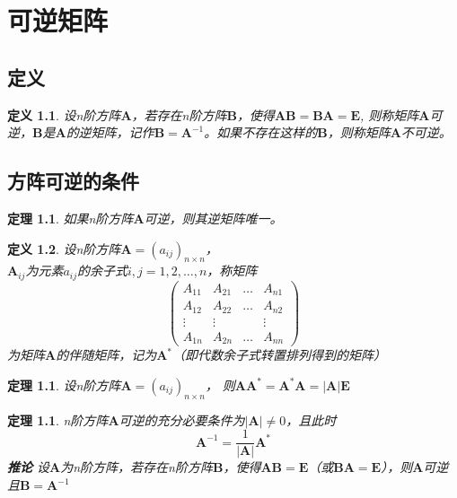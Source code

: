 \documentclass[a4paper]{ctexbook}
\newtheorem{definition}{定义}[section]
\newtheorem{theorem}[section]{定理}
\begin{document}
\chapter{可逆矩阵}
\section{定义}
\begin{definition}
    设n阶方阵\(\mathbf{A}\)，若存在n阶方阵\(\mathbf{B}\)，使得\(\mathbf{A}\mathbf{B}=\mathbf{B}\mathbf{A}=\mathbf{E}\),
    则称矩阵\(\mathbf{A}\)可逆，\(\mathbf{B}\)是\(\mathbf{A}\)的逆矩阵，记作\(\mathbf{B}=\mathbf{A}^{-1}\)。如果不存在这样的\(\mathbf{B}\)，则称矩阵\(\mathbf{A}\)不可逆。
\end{definition}

\section{方阵可逆的条件}
\begin{theorem}
    如果n阶方阵\(\mathbf{A}\)可逆，则其逆矩阵唯一。
\end{theorem}

\begin{definition}
    设n阶方阵\(\mathbf{A}=(a_{ij})_{n\times n}\)，
    \\ \(\mathbf{A}_{ij}\)为元素\(a_{ij}\)的余子式\(i,j=1,2, \dots ,n\)，称矩阵
    \[\begin{pmatrix}
        A_{11}&A_{21}&\dots&A_{n1}
        \\A_{12}&A_{22}&\dots&A_{n2}
        \\\vdots&\vdots&&\vdots
        \\A_{1n}&A_{2n}&\dots&A_{nn}
    \end{pmatrix}\]
    为矩阵\(\mathbf{A}\)的伴随矩阵，记为\(\mathbf{A}^{*}\)（即代数余子式转置排列得到的矩阵）
\end{definition}
\begin{theorem}
    设n阶方阵\(\mathbf{A}=(a_{ij})_{n\times n}\)，
    则\(\mathbf{A}\mathbf{A}^*=\mathbf{A}^*\mathbf{A}=\rvert \mathbf{A}\rvert\mathbf{E}\)
\end{theorem}
\begin{theorem}
    n阶方阵\(\mathbf{A}\)可逆的充分必要条件为\(\rvert \mathbf{A} \rvert \neq 0\)，且此时
    \[\mathbf{A}^{-1}=\frac{1}{\rvert \mathbf{A} \rvert} \mathbf{A}^*\]
    \textbf{推论} 设\(\mathbf{A}\)为n阶方阵，若存在n阶方阵\(\mathbf{B}\)，使得\(\mathbf{A}\mathbf{B}=\mathbf{E}\)（或\(\mathbf{B}\mathbf{A}=\mathbf{E}\)），则\(\mathbf{A}\)可逆且\(\mathbf{B}=\mathbf{A}^{-1}\)
\end{theorem}
\end{document}
